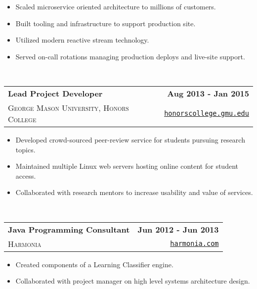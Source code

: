 \documentclass[letterpaper]{article}
\newenvironment{details}
{\begin{itemize}}
{\end{itemize}}
\begin{document}
  \begin{details}
  \item Scaled microservice oriented architecture to millions of customers.
  \item Built tooling and infrastructure to support production site.
  \item Utilized modern reactive stream technology.
  \item Served on-call rotations managing production deploys and live-site support.
  \end{details}
  \hfill\\
  \noindent
  \begin{tabularx}{\textwidth}{@{}X r@{}}
    \textbf{Lead Project Developer} & \textbf{Aug 2013 - Jan 2015} \\
    \textsc{George Mason University, Honors College} & \texttt{\href{http://honorscollege.gmu.edu/collegeresearch}{honorscollege.gmu.edu}}
  \end{tabularx}

  \begin{details}
  \item Developed crowd-sourced peer-review service for students pursuing research topics.
  \item Maintained multiple Linux web servers hosting online content for student access.
  \item Collaborated with research mentors to increase usability and value of services.
  \end{details}
  \hfill\\
  \noindent
  \begin{tabularx}{\textwidth}{@{}X r@{}}
    \textbf{Java Programming Consultant} & \textbf{Jun 2012 - Jun 2013} \\
    \textsc{Harmonia} & \texttt{\href{https://harmonia.com}{harmonia.com}}
  \end{tabularx}

  \begin{details}
  \item Created components of a Learning Classifier engine.
  \item Collaborated with project manager on high level systems architecture design.
  \end{details}
\end{document}
